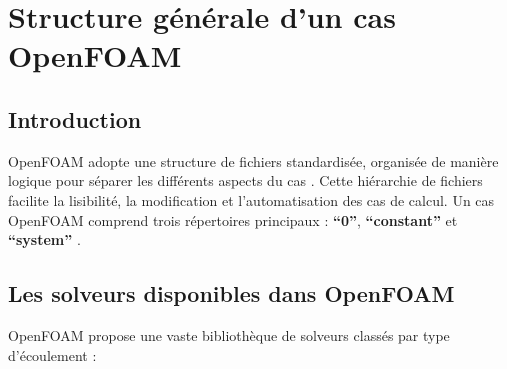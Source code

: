 \chapter{Structure générale d'un cas OpenFOAM}
\label{chap:structure_openfoam}

\section{Introduction}
\label{sec:introduction_openfoam}

OpenFOAM adopte une structure de fichiers standardisée, organisée de manière logique pour séparer les différents aspects du cas \cite{openfoam2022guide}. Cette hiérarchie de fichiers facilite la lisibilité, la modification et l'automatisation des cas de calcul. Un cas OpenFOAM comprend trois répertoires principaux : \textbf{``0''}, \textbf{``constant''} et \textbf{``system''} \cite{greenshields2020openfoam}.

\section{Les solveurs disponibles dans OpenFOAM}
\label{sec:solveurs_openfoam}

OpenFOAM propose une vaste bibliothèque de solveurs classés par type d'écoulement \cite{jasak1996error} :

